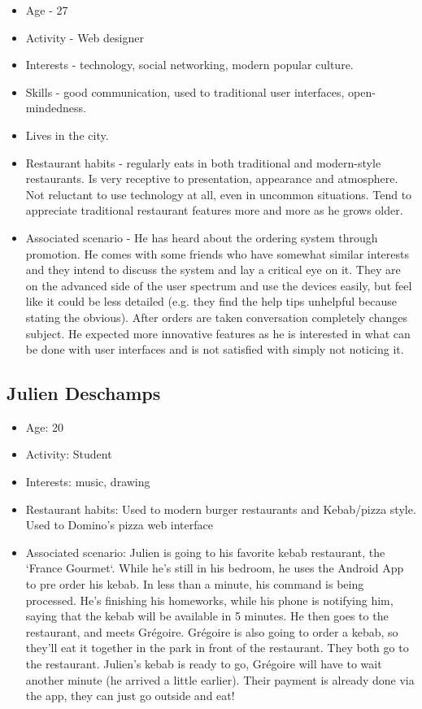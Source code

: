 \documentclass[a4paper,12pt]{article}
\begin{document}
\begin{itemize}

\item Age - 27
\item Activity - Web designer
\item Interests - technology, social networking, modern popular culture.
\item Skills - good communication, used to traditional user interfaces, open-mindedness.
\item Lives in the city.
\item Restaurant habits - regularly eats in both traditional and modern-style restaurants. Is very receptive to
	presentation, appearance and atmosphere. Not reluctant to use technology at all, even in uncommon situations.
	Tend to appreciate traditional restaurant features more and more as he grows older.
\item Associated scenario - He has heard about the ordering system through promotion. He comes with some friends
	who have somewhat similar interests and they intend to discuss the system and lay a critical eye on it. They are
	on the advanced side of the user spectrum and use the devices easily, but feel like it could be less detailed
	(e.g. they find the help tips unhelpful because stating the obvious). After orders are taken conversation
	completely changes subject. He expected more innovative features as he is interested in what can be done with
	user interfaces and is not satisfied with simply not noticing it.

\end{itemize}

\subsection{Julien Deschamps}

\begin{itemize}

\item Age: 20
\item Activity: Student
\item Interests: music, drawing
\item Restaurant habits: Used to modern burger restaurants and Kebab/pizza style. Used to Domino's pizza web interface
\item Associated scenario: Julien is going to his favorite kebab restaurant, the `France Gourmet`. While he's still
	in his bedroom, he uses the Android App to pre order his kebab. In less than a minute, his command is being
	processed. He's finishing his homeworks, while his phone is notifying him, saying that the kebab will be available
	in 5 minutes. He then goes to the restaurant, and meets Grégoire. Grégoire is also going to order a kebab, so
	they'll eat it together in the park in front of the restaurant. They both go to the restaurant. Julien's kebab
	is ready to go, Grégoire will have to wait another minute (he arrived a little earlier). Their payment is already
	done via the app, they can just go outside and eat!

\end{itemize}
\end{document}

